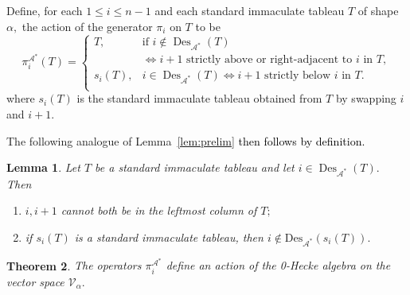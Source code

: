 \documentclass[12pt,letterpaper]{amsart}
\newcommand{\svw}{\textcolor{black}}
\newtheorem{theorem}{Theorem}[section]
\newtheorem{lemma}[theorem]{Lemma}
\theoremstyle{definition}
\DeclareMathOperator{\Des}{Des}
\begin{document}
Define, for each $1\le i\le n-1$ and each standard immaculate tableau $T$ of shape $\alpha,$ the action of the generator $\pi_i$ on $T$ to be 
\[\pi_i^{\mathcal{A}^*}(T)=\begin{cases} T, & \text{if } 
i\notin \Des_{\mathcal{A}^*}(T) \\
\phantom{T} &\iff i+1 \text{ strictly above or right-adjacent to $i$ in $T$} , \\
s_i(T), &  i\in \Des_{\mathcal{A}^*}(T) \iff i+1 \text{ strictly below $i$ in $T$}. \\
\end{cases}\]
where $s_i(T)$ is the standard immaculate tableau obtained from $T$ by swapping $i$ and $i+1.$ 

The following analogue of Lemma~\ref{lem:prelim} \svw{then follows by definition.}
\begin{lemma}\label{lem:prelimA} Let $T$ be a standard immaculate tableau and let $i\in \Des_{\mathcal{A}^*}(T).$  Then 
\begin{enumerate}
\item
$i, i+1$ cannot both be in the leftmost column of $T;$
\item if $s_i(T)$ is a standard immaculate tableau, then $i\notin \mathrm{Des}_{\mathcal{A}^*}(s_i(T)).$
\end{enumerate}
\end{lemma}
\begin{theorem}\label{thm:Hecke-action-A} The operators $\pi_i^{\mathcal{A}^*}$ define an action of the 0-Hecke algebra on the vector space $\mathcal{V}_\alpha.$ 
\end{theorem}
\end{document}
